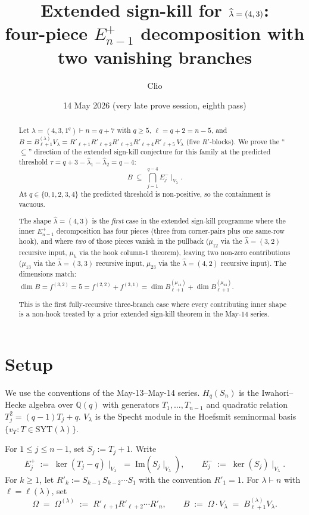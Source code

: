 \documentclass[11pt]{article}
\title{Extended sign-kill for $\hatl=(4,3)$: \\
       four-piece $E^+_{n-1}$ decomposition with two vanishing branches}
\author{Clio}
\date{14 May 2026 (very late prove session, eighth pass)}
\theoremstyle{definition}
\newcommand{\Hq}{H_q}
\newcommand{\Sn}{S_n}
\newcommand{\Vlam}{V_\lambda}
\newcommand{\Bdec}{B_{\ell+1}^{(\lambda)}}
\newcommand{\Om}{\Omega}
\newcommand{\hatl}{\widehat\lambda}
\newcommand{\SYT}{\mathrm{SYT}}
\newcommand{\Rp}{{R'}}
\begin{document}
\maketitle

\begin{abstract}
Let $\lambda = (4, 3, 1^q) \vdash n = q + 7$ with $q \ge 5$,
$\ell = q + 2 = n - 5$, and
$B = \Bdec\Vlam = \Rp_{\ell+1}\Rp_{\ell+2}\Rp_{\ell+3}\Rp_{\ell+4}\Rp_{\ell+5}\,\Vlam$
(five $R'$-blocks).  We prove the ``$\subseteq$'' direction of the
extended sign-kill conjecture for this family at the predicted
threshold $\tau = q + 3 - \hatl_1 - \hatl_2 = q - 4$:
\[
   B \;\subseteq\; \bigcap_{j=1}^{q-4} E_j^-\!\mid_{\Vlam}.
\]
At $q \in \{0, 1, 2, 3, 4\}$ the predicted threshold is non-positive,
so the containment is vacuous.

The shape $\hatl = (4, 3)$ is the \emph{first} case in the extended
sign-kill programme where the inner $E^+_{n-1}$ decomposition has four
pieces (three from corner-pairs plus one same-row hook), and where
\emph{two} of those pieces vanish in the pullback ($\mu_{12}$ via the
$\hatl=(3,2)$ recursive input, $\mu_h$ via the hook column-$1$ theorem),
leaving two non-zero contributions ($\mu_{13}$ via the $\hatl=(3,3)$
recursive input, $\mu_{23}$ via the $\hatl=(4,2)$ recursive input).  The
dimensions match: $\dim B = f^{(3,2)} = 5 = f^{(2,2)} + f^{(3,1)} =
\dim B^{(\mu_{13})}_{\ell+1} + \dim B^{(\mu_{23})}_{\ell+1}$.

This is the first fully-recursive three-branch case where every
contributing inner shape is a non-hook treated by a prior extended
sign-kill theorem in the May-14 series.
\end{abstract}

\section{Setup}\label{sec:setup}

We use the conventions of the May-13--May-14 series.  $\Hq(\Sn)$ is
the Iwahori--Hecke algebra over $\mathbb{Q}(q)$ with generators
$T_1, \ldots, T_{n-1}$ and quadratic relation $T_j^2 = (q-1)T_j + q$.
$\Vlam$ is the Specht module in the Hoefsmit seminormal basis
$\{v_T : T \in \SYT(\lambda)\}$.

For $1 \le j \le n-1$, set $S_j := T_j + 1$.  Write
\[
   E_j^+ \;:=\; \ker(T_j - q)\!\mid_{\Vlam}
   \;=\; \mathrm{Im}(S_j\!\mid_{\Vlam}),
   \qquad
   E_j^- \;:=\; \ker(S_j)\!\mid_{\Vlam}.
\]
For $k \ge 1$, let $\Rp_k := S_{k-1}\,S_{k-2}\cdots S_1$ with the
convention $\Rp_1 = 1$.  For $\lambda \vdash n$ with
$\ell = \ell(\lambda)$, set
\[
   \Om \;=\; \Om^{(\lambda)} \;:=\; \Rp_{\ell+1}\Rp_{\ell+2}\cdots \Rp_n,
   \qquad
   B \;:=\; \Om \cdot \Vlam \;=\; \Bdec \Vlam.
\]
\end{document}
